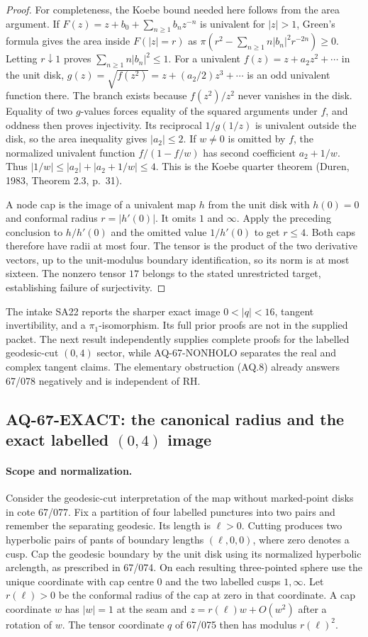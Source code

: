 \documentclass[11pt,a4paper]{article}
\theoremstyle{definition}\newtheorem{definition}[theorem]{Definition}
\theoremstyle{remark}\newtheorem{remark}[theorem]{Remark}
\begin{document}
\begin{proof}
For completeness, the Koebe bound needed here follows
from the area argument. If
$F(z)=z+b_0+\sum_{n\geq1}b_nz^{-n}$ is univalent for
$|z|>1$, Green's formula gives the area inside
$F(|z|=r)$ as
$\pi(r^2-\sum_{n\geq1}n|b_n|^2r^{-2n})\geq0$.
Letting $r\downarrow1$ proves
$\sum_{n\geq1}n|b_n|^2\leq1$.
For a univalent $f(z)=z+a_2z^2+\cdots$ in the unit disk,
$g(z)=\sqrt{f(z^2)}=z+(a_2/2)z^3+\cdots$ is an odd
univalent function there. The branch exists because
$f(z^2)/z^2$ never vanishes in the disk. Equality of
two $g$-values forces equality of the squared
arguments under $f$, and oddness then proves
injectivity. Its reciprocal
$1/g(1/z)$ is univalent outside the disk, so the area
inequality gives $|a_2|\leq2$.
If $w\ne0$ is omitted by $f$, the normalized univalent
function $f/(1-f/w)$ has second coefficient $a_2+1/w$.
Thus $|1/w|\leq|a_2|+|a_2+1/w|\leq4$.
This is the Koebe quarter theorem (Duren, 1983,
Theorem 2.3, p.~31).

A node cap is the image of a univalent map $h$ from
the unit disk with $h(0)=0$ and conformal radius
$r=|h'(0)|$. It omits $1$ and $\infty$.
Apply the preceding conclusion to $h/h'(0)$ and
the omitted value $1/h'(0)$ to get $r\leq4$.
Both caps therefore have radii at most four.
The tensor is the product of the two derivative
vectors, up to the unit-modulus boundary identification,
so its norm is at most sixteen. The nonzero tensor
$17$ belongs to the stated unrestricted target,
establishing failure of surjectivity.
\end{proof}
The intake SA22 reports the sharper exact image
$0<|q|<16$, tangent invertibility, and a $\pi_1$-isomorphism.
Its full prior proofs are not in the supplied packet.
The next result independently supplies complete proofs
for the labelled geodesic-cut $(0,4)$ sector, while
AQ-67-NONHOLO separates the real and complex tangent claims.
The elementary obstruction (AQ.8) already answers
67/078 negatively and is independent of RH.

\subsection{AQ-67-EXACT: the canonical radius and the exact labelled $(0,4)$ image}
\paragraph{Scope and normalization.}
Consider the geodesic-cut interpretation of the map without marked-point
disks in cote 67/077. Fix a partition of four labelled punctures into two
pairs and remember the separating geodesic. Its length is $\ell>0$.
Cutting produces two hyperbolic pairs of pants of boundary lengths
$(\ell,0,0)$, where zero denotes a cusp. Cap the geodesic boundary by the
unit disk using its normalized hyperbolic arclength, as prescribed in
67/074. On each resulting three-pointed sphere use the unique coordinate
with cap centre $0$ and the two labelled cusps $1,\infty$.
Let $r(\ell)>0$ be the conformal radius of the cap at zero in that
coordinate. A cap coordinate $w$ has $|w|=1$ at the seam and
$z=r(\ell)w+O(w^2)$ after a rotation of $w$.
The tensor coordinate $q$ of 67/075 then has modulus $r(\ell)^2$.
\end{document}
